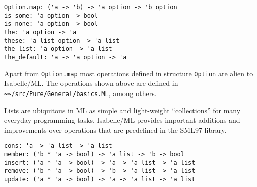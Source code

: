 \begin{isabellebody}
\begin{isamarkuptext}
\begin{description}
  \end{description}%
\end{isamarkuptext}%
\isamarkuptrue%
%
\endisatagmlref
{\isafoldmlref}%
%
\isadelimmlref
%
\endisadelimmlref
%
\isamarkuptrue%
%
\isadelimmlref
%
\endisadelimmlref
%
\isatagmlref
%
\begin{isamarkuptext}%
\begin{mldecls}
  \verb|Option.map: ('a -> 'b) -> 'a option -> 'b option| \\
  \verb|is_some: 'a option -> bool| \\
  \verb|is_none: 'a option -> bool| \\
  \verb|the: 'a option -> 'a| \\
  \verb|these: 'a list option -> 'a list| \\
  \verb|the_list: 'a option -> 'a list| \\
  \verb|the_default: 'a -> 'a option -> 'a| \\
  \end{mldecls}%
\end{isamarkuptext}%
\isamarkuptrue%
%
\endisatagmlref
{\isafoldmlref}%
%
\isadelimmlref
%
\endisadelimmlref
%
\begin{isamarkuptext}%
Apart from \verb|Option.map| most operations defined in
  structure \verb|Option| are alien to Isabelle/ML.  The
  operations shown above are defined in \verb|~~/src/Pure/General/basics.ML|, among others.%
\end{isamarkuptext}%
\isamarkuptrue%
%
\isamarkuptrue%
%
\begin{isamarkuptext}%
Lists are ubiquitous in ML as simple and light-weight
  ``collections'' for many everyday programming tasks.  Isabelle/ML
  provides important additions and improvements over operations that
  are predefined in the SML97 library.%
\end{isamarkuptext}%
\isamarkuptrue%
%
\isadelimmlref
%
\endisadelimmlref
%
\isatagmlref
%
\begin{isamarkuptext}%
\begin{mldecls}
  \verb|cons: 'a -> 'a list -> 'a list| \\
  \verb|member: ('b * 'a -> bool) -> 'a list -> 'b -> bool| \\
  \verb|insert: ('a * 'a -> bool) -> 'a -> 'a list -> 'a list| \\
  \verb|remove: ('b * 'a -> bool) -> 'b -> 'a list -> 'a list| \\
  \verb|update: ('a * 'a -> bool) -> 'a -> 'a list -> 'a list| \\
  \end{mldecls}


\end{isamarkuptext}
\end{isabellebody}
